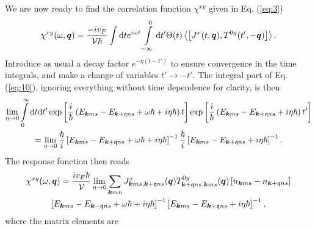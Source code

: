We are now ready to find the correlation function $\chi ^{xy}$ given in Eq. (\ref{eq:3})
\begin{equation}
  \label{eq:10}
  \chi ^{xy}(\omega, \vec{q}) =
  \frac{-i v_F}{\mathcal{V} \hbar } 
  \int \mathrm{d}t e^{i \omega t} \int\limits_{-\infty }^0 \mathrm{d}t'
  \Theta (t)
  \Braket{\left[
J^x(t, \vec{q}), T^{0y}(t', -\vec{q})
    \right]}.
\end{equation}
Introduce as usual a decay factor $e^{-\eta (t-t')}$ to ensure convergence in the time integrals, and make a change of variables $t' \to -t'	$.
The integral part of Eq. (\ref{eq:10}), ignoring everything without time dependence for clarity, is then
\begin{multline}
  \lim_{\eta \to 0}
  \int\limits_{0}^{\infty } \mathrm{d}t \mathrm{d}t'
    \exp \left[ \frac{i}{\hbar } \left(
        E_{\bm{k} m s} - E_{\bm{k}+\mathfrak{q} ns} + \omega \hbar  + i \eta \hbar 
      \right) t \right]
    \exp \left[ \frac{i}{\hbar } \left(
        E_{\bm{k} m s} - E_{\bm{k}+\mathfrak{q} ns} + i \eta \hbar 
      \right) t' \right]\\
  =
  \lim_{\eta \to 0}\frac{\hbar}{i} \left[ E_{\bm{k}ms} - E_{\bm{k}+\mathfrak{q} ns} + \omega \hbar  + i\eta \hbar  \right]^{-1}
\frac{\hbar}{i} \left[ E_{\bm{k}ms} - E_{\bm{k}+\mathfrak{q} ns} + i \eta \hbar  \right]^{-1}.
\end{multline}
The response function then reads
\begin{multline}
  \chi ^{xy}(\omega , \bm{q}) =
  \frac{i v_F \hbar }{\mathcal{V} }
  \lim_{\eta \to 0}
  \sum\limits_{\bm{k}mn}^{}
  J^x_{\bm{k}ms, \bm{k}+\mathfrak{q}ns}(\bm{q})
  T^{0y}_{\bm{k}+\mathfrak{q}ns, \bm{k}ms}(\bm{q})
  \left[ n_{\bm{k}ms}- n_{\bm{k}+\mathfrak{q} ns} \right] \\
  \left[ E_{\bm{k}ms} - E_{\bm{k}-\mathfrak{q} ns} + \omega \hbar  + i\eta \hbar  \right]^{-1}
  \left[ E_{\bm{k}ms} - E_{\bm{k}+\mathfrak{q} ns} + i \eta \hbar  \right]^{-1},
\end{multline}
where the matrix elements are
